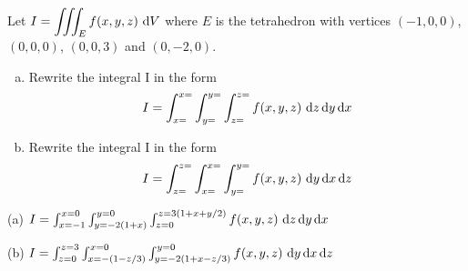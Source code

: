 \begin{question}[M200 2009A] %
Let $\displaystyle I = \tripInt_E f(x,y,z)\ \dee{V}$ 
where $E$ is the tetrahedron with vertices $(-1, 0, 0)$,
$(0, 0, 0)$, $(0, 0, 3)$ and $(0, -2, 0)$.


\begin{enumerate}[(a)]
\item
Rewrite the integral I in the form
\begin{equation*}
I = \int_{x=}^{x=}\int_{y=}^{y=}\int_{z=}^{z=} f(x,y,z)\ 
                                      \dee{z}\,\dee{y}\,\dee{x}
\end{equation*}

\item
Rewrite the integral I in the form
\begin{equation*}
I = \int_{z=}^{z=}\int_{x=}^{x=}\int_{y=}^{y=} f(x,y,z)\ 
                                      \dee{y}\,\dee{x}\,\dee{z}
\end{equation*}
\end{enumerate}
\end{question}

%

\begin{answer}
(a) $I = \int_{x=-1}^{x=0}\int_{y=-2(1+x)}^{y=0}\int_{z=0}^{z=3(1+x+y/2)} 
            f(x,y,z)\ \mathrm{d}z\,\mathrm{d}y\,\mathrm{d}x$

(b) $I = \int_{z=0}^{z=3}\int_{x=-(1-z/3)}^{x=0}\int_{y=-2(1+x-z/3)}^{y=0} 
             f(x,y,z)\ \mathrm{d}y\,\mathrm{d}x\,\mathrm{d}z$
\end{answer}

